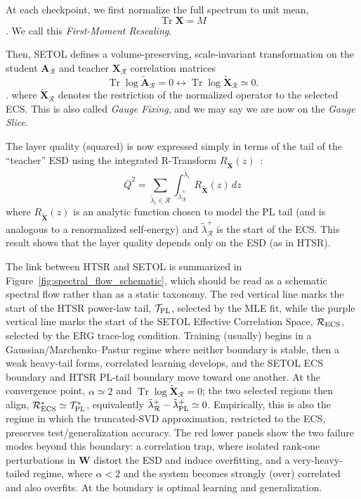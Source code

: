 \documentclass[10pt,twocolumn]{article}
\newcommand{\Tr}{\operatorname{Tr}}
\newcommand{\W}{\mathbf W}
\newcommand{\X}{\mathbf X}
\newcommand{\A}{\mathbf A}
\newcommand{\Xtilde}{\widetilde{\mathbf X}}
\newcommand{\Rell}{\mathcal R}
\newcommand{\TPL}{\mathcal T_{\rm PL}}
\newcommand{\RECS}{\mathcal R_{\rm ECS}}
\newcommand{\ECSstart}{\tilde{\lambda}^{+}_{\Rell}}
\begin{document}

At each checkpoint, we first normalize the full spectrum to unit mean,
\begin{equation}
\Tr{\X}=M
\end{equation}.
We call this \emph{First-Moment Rescaling}.

Then,  SETOL defines a volume-preserving, scale-invariant transformation 
on the student $\A_{\Rell}$ and teacher $\X_{\Rell}$ correlation matrices
\begin{equation}
\Tr\log\widetilde{\mathbf A}_{\Rell}=0 \leftrightarrow \Tr\log\Xtilde_{\Rell}\simeq0 .
\label{eq:setol_trlog_AX}
\end{equation}.
where  $\Xtilde_{\Rell}$ denotes the restriction of the normalized operator to the selected ECS.
This is also called \emph{Gauge Fixing}, and we may say we are now on the \emph{Gauge Slice}.

The layer quality (squared) is now expressed
simply in terms of the tail of the ``teacher'' ESD 
using the integrated R-Transform $R_{\Xtilde}(z)$~\cite{Zee1996}:
\begin{equation}
\overline{Q}^{2}
=
\sum_{\tilde{\lambda}_{i}\in\Rell}
\int_{\ECSstart}^{\tilde{\lambda}_{i}}
R_{\Xtilde}(z)\, dz
\label{eq:setol_Q}
\end{equation}
where $R_{\Xtilde}(z)$ is an analytic function chosen to model the PL tail
(and is analogous to a renormalized self-energy)
and $\ECSstart$ is the start of the ECS.
This result shows that the layer quality depends only on the ESD
(as in HTSR).

The link between HTSR and SETOL is summarized in Figure~\ref{fig:spectral_flow_schematic}, which should be read as a schematic spectral flow rather than as a static taxonomy. The red vertical line marks the start of the HTSR power-law tail, $\TPL$, selected by the MLE fit, while the purple vertical line marks the start of the SETOL Effective Correlation Space, $\RECS$, selected by the ERG trace-log condition.  Training (usually) begins in a Gaussian/Marchenko--Pastur regime where neither boundary is stable, then a weak heavy-tail forms, correlated learning develops, and the SETOL ECS boundary and HTSR PL-tail boundary move toward one another. At the convergence point, $\alpha \simeq 2$ and $\Tr\log\Xtilde_{\Rell}=0$; the two selected regions then align, $\Rell_{\rm ECS}^{*} \simeq \mathcal T_{\rm PL}^{*}$, equivalently $\tilde{\lambda}^{+}_{\Rell}-\tilde{\lambda}^{+}_{\rm PL}\simeq 0$. Empirically, this is also the regime in which the truncated-SVD approximation, restricted to the ECS, preserves test/generalization accuracy. The red lower panels show the two failure modes beyond this boundary: a correlation trap, where isolated rank-one perturbations in $\W$ distort the ESD and induce overfitting, and a very-heavy-tailed regime, where $\alpha < 2$ and the system  becomes strongly (over) correlated and also overfits. At the boundary is optimal learning and generalization.
\end{document}
